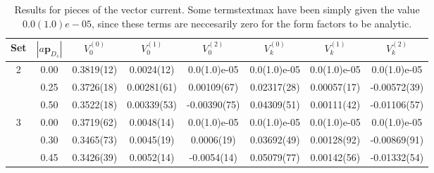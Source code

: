 \begin{table}
\begin{center}
\begin{tabular}{|| c c c c c c c c ||}
\hline
Set & $|a{\textbf{p}}_{D_s}|$ & $V_0^{(0)}$ & $V_0^{(1)}$ & $V_0^{(2)}$ & $V_k^{(0)}$ & $V_k^{(1)}$ & $V_k^{(2)}$ \\ [0.5ex]
\hline \hline
2 & 0.00 & 0.3819(12) & 0.0024(12) & 0.0(1.0)e-05 & 0.0(1.0)e-05 & 0.0(1.0)e-05 & 0.0(1.0)e-05\\ [0.5ex] 
 & 0.25 & 0.3726(18) & 0.00281(61) & 0.00109(67) & 0.02317(28) & 0.00057(17) & -0.00572(39)\\ [0.5ex] 
 & 0.50 & 0.3522(18) & 0.00339(53) & -0.00390(75) & 0.04309(51) & 0.00111(42) & -0.01106(57)\\ [0.5ex] 
3 & 0.00 & 0.3719(62) & 0.0048(14) & 0.0(1.0)e-05 & 0.0(1.0)e-05 & 0.0(1.0)e-05 & 0.0(1.0)e-05\\ [0.5ex] 
 & 0.30 & 0.3465(73) & 0.0045(19) & 0.0006(19) & 0.03692(49) & 0.00128(92) & -0.00869(91)\\ [0.5ex] 
 & 0.45 & 0.3426(39) & 0.0052(14) & -0.0054(14) & 0.05079(77) & 0.00142(56) & -0.01332(54)\\ [0.5ex] 
\hline
\end{tabular}
\caption{Results for pieces of the vector current. Some termstext{max} have been simply given the value $0.0(1.0)e-05$, since these terms are neccesarily zero for the form factors to be analytic. \label{table:fitresults} }
\end{center}
\end{table}

